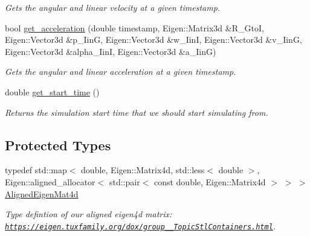 \begin{DoxyCompactItemize}
\begin{DoxyCompactList}\small\item\em Gets the angular and linear velocity at a given timestamp. \end{DoxyCompactList}\item 
bool \hyperlink{classov__core_1_1BsplineSE3_a487ddccc242464c38111489d325a7479}{get\+\_\+acceleration} (double timestamp, Eigen\+::\+Matrix3d \&R\+\_\+\+GtoI, Eigen\+::\+Vector3d \&p\+\_\+\+IinG, Eigen\+::\+Vector3d \&w\+\_\+\+IinI, Eigen\+::\+Vector3d \&v\+\_\+\+IinG, Eigen\+::\+Vector3d \&alpha\+\_\+\+IinI, Eigen\+::\+Vector3d \&a\+\_\+\+IinG)
\begin{DoxyCompactList}\small\item\em Gets the angular and linear acceleration at a given timestamp. \end{DoxyCompactList}\item 
\mbox{\label{classov__core_1_1BsplineSE3_ae44f184ee4052cf65d8161063dc9ecae}} 
double \hyperlink{classov__core_1_1BsplineSE3_ae44f184ee4052cf65d8161063dc9ecae}{get\+\_\+start\+\_\+time} ()
\begin{DoxyCompactList}\small\item\em Returns the simulation start time that we should start simulating from. \end{DoxyCompactList}\end{DoxyCompactItemize}
\subsection*{Protected Types}
\begin{DoxyCompactItemize}
\item 
\mbox{\label{classov__core_1_1BsplineSE3_a2e0b3cb7cef84db7b84598f2ea01e00d}} 
typedef std\+::map$<$ double, Eigen\+::\+Matrix4d, std\+::less$<$ double $>$, Eigen\+::aligned\+\_\+allocator$<$ std\+::pair$<$ const double, Eigen\+::\+Matrix4d $>$ $>$ $>$ \hyperlink{classov__core_1_1BsplineSE3_a2e0b3cb7cef84db7b84598f2ea01e00d}{Aligned\+Eigen\+Mat4d}
\begin{DoxyCompactList}\small\item\em Type defintion of our aligned eigen4d matrix\+: \href{https://eigen.tuxfamily.org/dox/group__TopicStlContainers.html}{\tt https\+://eigen.\+tuxfamily.\+org/dox/group\+\_\+\+\_\+\+Topic\+Stl\+Containers.\+html}. \end{DoxyCompactList}\end{DoxyCompactItemize}
